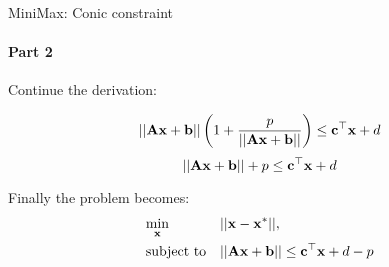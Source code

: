 \documentclass{beamer}
\begin{document}
\begin{frame}{MiniMax: Conic constraint}
	\framesubtitle{Part 2}
	\begin{flushleft}
		
		Continue the derivation:
		
		\begin{equation}
			|| \mathbf{A}\mathbf{x} + \mathbf{b}|| \left( 1 + \frac{p}{|| \mathbf{A}\mathbf{x} + \mathbf{b}||} \right) \leq \mathbf{c}^\top \mathbf{x} + d
		\end{equation}
		\begin{equation}
			|| \mathbf{A}\mathbf{x} + \mathbf{b}|| + p \leq \mathbf{c}^\top \mathbf{x} + d
		\end{equation}
		
		Finally the problem becomes:
		\begin{equation}
			\begin{aligned}
				& \underset{\mathbf{x}}{\text{min}}
				& & ||\mathbf{x} - \mathbf{x}^*||, \\
				& \text{subject to}
				& & || \mathbf{A}\mathbf{x} + \mathbf{b}|| \leq \mathbf{c}^\top \mathbf{x} + d - p
			\end{aligned}
		\end{equation}
		
		
		
	\end{flushleft}
\end{frame}
\end{document}
